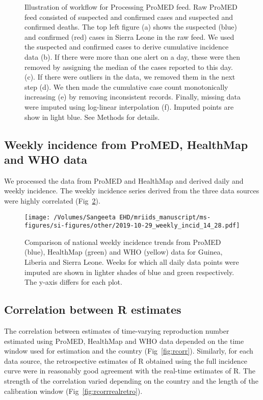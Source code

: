 \documentclass[9pt,twoside,lineno]{pnas-new}
\begin{document}
\begin{figure}
  \caption{Illustration of workflow for Processing ProMED feed.
    Raw ProMED feed consisted of suspected and confirmed
    cases and suspected and confirmed
    deaths. The top left figure (a) shows the suspected (blue) and
    confirmed (red) cases in Sierra Leone in the raw feed.
    We used the suspected and confirmed cases to derive cumulative
    incidence data (b). If there were more than one alert on a day, 
    these were then removed
    by assigning the median of the cases reported to this day.
    (c).
    If there were outliers in the data, we removed them in the next step (d).
    We then made the cumulative case count monotonically increasing (e) by
    removing inconsistent records. Finally, missing data were imputed using
    log-linear interpolation (f). Imputed points are show in light blue.
    See Methods for details.}
\label{fig:dataclean}
\end{figure}\FloatBarrier

\subsection{Weekly incidence from ProMED, HealthMap and WHO data}

We processed the data from ProMED and HealthMap and derived daily and
weekly incidence. The weekly incidence series derived from the three
data sources were highly correlated (Fig~\ref{fig:weekly}).

\begin{figure}
  \centering
  \texttt{[image: /Volumes/Sangeeta EHD/mriids\_manuscript/ms-figures/si-figures/other/2019-10-29\_weekly\_incid\_14\_28.pdf]}
  \caption{Comparison of national weekly incidence trends from ProMED (blue),
    HealthMap (green) and WHO (yellow) data for Guinea, Liberia and
    Sierra Leone. Weeks for which all daily data points were imputed
    are shown in lighter shades of blue and green respectively. The
y-axis differs for each plot.}
\label{fig:weekly}
\end{figure}\FloatBarrier


\subsection{Correlation between R estimates}\label{correlation-between-r-estimates}

The correlation between estimates of time-varying reproduction number 
estimated using ProMED, HealthMap and WHO data depended on the
time window used for estimation and the country
(Fig~\ref{fig:rcorr}). Similarly, for each data source, the
retrospective estimates of R obtained using the full incidence curve
were in reasonably good agreement with the real-time estimates of R.
The strength of the correlation varied depending on the country and
the length of the calibration window (Fig~\ref{fig:rcorrrealretro}).
\end{document}
